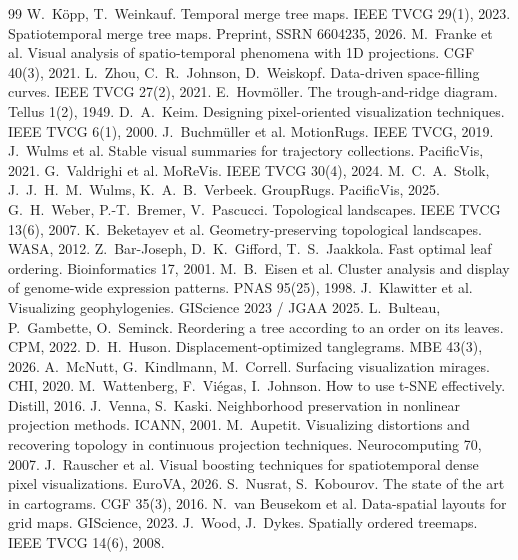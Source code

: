 \documentclass[10pt,twocolumn]{article}
\begin{document}
\begin{thebibliography}{99}\small
 W.~K\"opp, T.~Weinkauf. Temporal merge tree maps. IEEE TVCG 29(1), 2023.
 Spatiotemporal merge tree maps. Preprint, SSRN 6604235, 2026.
 M.~Franke et al. Visual analysis of spatio-temporal phenomena with 1D projections. CGF 40(3), 2021.
 L.~Zhou, C.~R.~Johnson, D.~Weiskopf. Data-driven space-filling curves. IEEE TVCG 27(2), 2021.
 E.~Hovm\"oller. The trough-and-ridge diagram. Tellus 1(2), 1949.
 D.~A.~Keim. Designing pixel-oriented visualization techniques. IEEE TVCG 6(1), 2000.
 J.~Buchm\"uller et al. MotionRugs. IEEE TVCG, 2019.
 J.~Wulms et al. Stable visual summaries for trajectory collections. PacificVis, 2021.
 G.~Valdrighi et al. MoReVis. IEEE TVCG 30(4), 2024.
 M.~C.~A.~Stolk, J.~J.~H.~M.~Wulms, K.~A.~B.~Verbeek. GroupRugs. PacificVis, 2025.
 G.~H.~Weber, P.-T.~Bremer, V.~Pascucci. Topological landscapes. IEEE TVCG 13(6), 2007.
 K.~Beketayev et al. Geometry-preserving topological landscapes. WASA, 2012.
 Z.~Bar-Joseph, D.~K.~Gifford, T.~S.~Jaakkola. Fast optimal leaf ordering. Bioinformatics 17, 2001.
 M.~B.~Eisen et al. Cluster analysis and display of genome-wide expression patterns. PNAS 95(25), 1998.
 J.~Klawitter et al. Visualizing geophylogenies. GIScience 2023 / JGAA 2025.
 L.~Bulteau, P.~Gambette, O.~Seminck. Reordering a tree according to an order on its leaves. CPM, 2022.
 D.~H.~Huson. Displacement-optimized tanglegrams. MBE 43(3), 2026.
 A.~McNutt, G.~Kindlmann, M.~Correll. Surfacing visualization mirages. CHI, 2020.
 M.~Wattenberg, F.~Vi\'egas, I.~Johnson. How to use t-SNE effectively. Distill, 2016.
 J.~Venna, S.~Kaski. Neighborhood preservation in nonlinear projection methods. ICANN, 2001.
 M.~Aupetit. Visualizing distortions and recovering topology in continuous projection techniques. Neurocomputing 70, 2007.
 J.~Rauscher et al. Visual boosting techniques for spatiotemporal dense pixel visualizations. EuroVA, 2026.
 S.~Nusrat, S.~Kobourov. The state of the art in cartograms. CGF 35(3), 2016.
 N.~van Beusekom et al. Data-spatial layouts for grid maps. GIScience, 2023.
 J.~Wood, J.~Dykes. Spatially ordered treemaps. IEEE TVCG 14(6), 2008.

\end{thebibliography}
\end{document}
